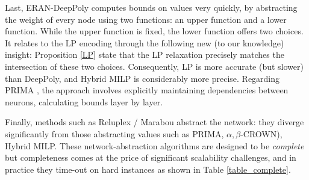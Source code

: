 Last, ERAN-DeepPoly \cite{deeppoly} computes bounds on values very quickly, by abstracting the weight of every node using two functions: an upper function and a lower function. While the upper function is fixed, the lower function offers two choices.
It relates to the LP encoding through the following new (to our knowledge) insight:  Proposition \ref{LP} state that the LP relaxation precisely matches the intersection of these two choices. Consequently, LP is more accurate (but slower) than DeepPoly, and Hybrid MILP is considerably more precise. Regarding PRIMA \cite{prima}, the approach involves explicitly maintaining dependencies between neurons, calculating bounds layer by layer.




Finally, methods such as Reluplex / Marabou \cite{Reluplex,Marabou}  abstract the network: they diverge significantly from those abstracting values such as PRIMA, $\alpha,\beta$-CROWN)\cite{prima,crown}, Hybrid MILP. 
These network-abstraction algorithms are designed to be {\em complete} but completeness comes at the price of significant scalability challenges, and in practice they time-out on hard instances as shown in Table \ref{table_complete}.